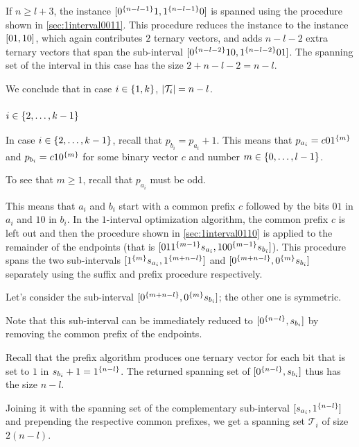 If $n \geq l + 3$,
the instance
$[0^{\{n-l-1\}} 1, 1^{\{n-l-1\}} 0]$
is spanned using the procedure
shown in \autoref{sec:1interval0011}.
This procedure reduces the instance
to the instance $[01, 10]$,
which again contributes $2$ ternary vectors,
and adds $n-l-2$ extra ternary vectors
that span the sub-interval
$[0^{\{n-l-2\}} 10, 1^{\{n-l-2\}} 01]$.
The spanning set of the interval in this case has the size
$2 + n - l - 2 = n - l$.

We conclude that in case $i \in \{1, k\}$,
$\lvert\mathcal{T}_i\rvert = n-l$.

\subsubsection{$i \in \{2, \ldots, k-1\}$}

In case $i \in \{2, \ldots, k-1\}$,
recall that $p_{b_i} = p_{a_i} + 1$.
This means that $p_{a_i} = c 0 1^{\{m\}}$
and $p_{b_i} = c 1 0^{\{m\}}$
for some binary vector $c$
and number $m \in \{0, \ldots, l-1\}$.

To see that $m \geq 1$,
recall that $p_{a_i}$ must be odd.

This means that $a_i$ and $b_i$
start with a common prefix $c$
followed by the bits $01$ in $a_i$
and $10$ in $b_i$.
In the $1$-interval optimization algorithm,
the common prefix $c$ is left out
and then the procedure
shown in \autoref{sec:1interval0110}
is applied to the remainder of the endpoints
(that is
$[01 1^{\{m-1\}} s_{a_i}, 10 0^{\{m-1\}} s_{b_i}]$).
This procedure spans the two sub-intervals
$[1^{\{m\}} s_{a_i}, 1^{\{m+n-l\}}]$
and $[0^{\{m+n-l\}}, 0^{\{m\}} s_{b_i}]$
separately using the suffix and prefix procedure
respectively.

Let's consider the sub-interval
$[0^{\{m+n-l\}}, 0^{\{m\}} s_{b_i}]$;
the other one is symmetric.

Note that this sub-interval can be immediately reduced
to $[0^{\{n-l\}}, s_{b_i}]$
by removing the common prefix of the endpoints.

Recall that the prefix algorithm
produces one ternary vector
for each bit that is set to $1$
in $s_{b_i} + 1 = 1^{\{n-l\}}$.
The returned spanning set of
$[0^{\{n-l\}}, s_{b_i}]$
thus has the size $n-l$.

Joining it with the spanning set of the complementary
sub-interval
$[s_{a_i}, 1^{\{n-l\}}]$
and prepending the respective common prefixes,
we get a spanning set $\mathcal{T}_i$ of size $2(n-l)$.

